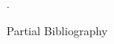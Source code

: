 \documentclass[beamer,10pt]{standalone}
\begin{document}
\begin{frame}
 .
\end{frame}














\ifstandalone
\begin{frame}[t,allowframebreaks]{Partial Bibliography}
	\nocite{Miti2021}
	
	
\end{frame}
\fi



\end{document}
